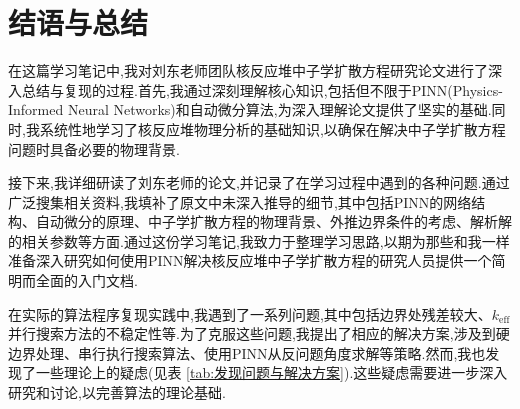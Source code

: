 \documentclass{Sichuan Normal University}
\begin{document}

\newpage

\section{结语与总结}

在这篇学习笔记中,我对刘东老师团队核反应堆中子学扩散方程研究论文进行了深入总结与复现的过程.首先,我通过深刻理解核心知识,包括但不限于PINN(Physics-Informed Neural Networks)和自动微分算法,为深入理解论文提供了坚实的基础.同时,我系统性地学习了核反应堆物理分析的基础知识,以确保在解决中子学扩散方程问题时具备必要的物理背景.

接下来,我详细研读了刘东老师的论文,并记录了在学习过程中遇到的各种问题.通过广泛搜集相关资料,我填补了原文中未深入推导的细节,其中包括PINN的网络结构、自动微分的原理、中子学扩散方程的物理背景、外推边界条件的考虑、解析解的相关参数等方面.通过这份学习笔记,我致力于整理学习思路,以期为那些和我一样准备深入研究如何使用PINN解决核反应堆中子学扩散方程的研究人员提供一个简明而全面的入门文档.

在实际的算法程序复现实践中,我遇到了一系列问题,其中包括边界处残差较大、$k_{\text{eff}}$并行搜索方法的不稳定性等.为了克服这些问题,我提出了相应的解决方案,涉及到硬边界处理、串行执行搜索算法、使用PINN从反问题角度求解等策略.然而,我也发现了一些理论上的疑虑(见表 \ref{tab:发现问题与解决方案}).这些疑虑需要进一步深入研究和讨论,以完善算法的理论基础.
\end{document}
